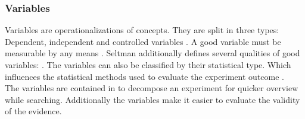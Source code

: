 
\subsubsection{Variables}

Variables are operationalizations of concepts. They are split in three types: Dependent, independent and controlled variables \cite{BuddiesVariables,Seltman2015}. A good variable must be measurable by any means \cite{BuddiesVariables}. Seltman additionally defines several qualities of good variables:  \cite[p. 10]{Seltman2015}. The variables can also be classified by their statistical type. Which influences the statistical methods used to evaluate the experiment outcome \cite[p. 12-16]{Seltman2015}.\\
The variables are contained in \briefingform{} to decompose an experiment for quicker overview while searching. Additionally the variables make it easier to evaluate the validity of the evidence.